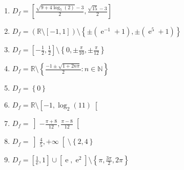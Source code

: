 \documentclass[a4paper,12pt]{article}
\newcommand{\set}[1]{\left\{#1\right\}}
\newcommand{\minuss}[1]{\setminus\left\{#1\right\}}
\newcommand{\minusifo}[1]{\setminus\left\lbrack#1\right\lbrack}
\newcommand{\minusiff}[1]{\setminus\left\lbrack#1\right\rbrack}
\newcommand{\intoo}[1]{\left\rbrack#1\right\lbrack}
\newcommand{\intff}[1]{\left\lbrack#1\right\rbrack}
\DeclareMathOperator{\e}{e}
\begin{document}
\begin{multicols}{2}
\begin{enumerate}
\item $D_f=\intff{\frac{\sqrt{9+4\log_5(2)}-3}{2},\frac{\sqrt{15}-3}{2}}$
\item $D_f=\left(\mathbb{R}\minusiff{-1,1}\right)\minuss{\pm(\e^{-1}+1),\pm(\e^5+1)}$
\item $D_f=\intff{-\frac{1}{2},\frac{1}{2}}\minuss{0,\pm\frac{\pi}{10},\pm\frac{\pi}{12}}$
\item $D_f=\mathbb{R}\minuss{\frac{-1\pm\sqrt{1+2n\pi}}{2}: n\in\mathbb{N}}$
\item $D_f=\set{0}$
\item $D_f=\mathbb{R}\minusifo{-1,\log_2(11)}$
\item $D_f=\intoo{-\frac{\pi+8}{12},\frac{\pi-8}{12}}$
\item $D_f=\intoo{\frac{4}{5},+\infty}\minuss{2,4}$
\item $D_f=\intff{\frac{1}{\e},1}\cup\intff{\e,\e^2}\minuss{\pi,\frac{3\pi}{2},2\pi}$

\end{enumerate}
\end{multicols}
\end{document}
